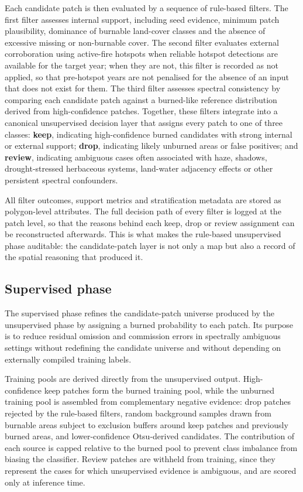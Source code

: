 \documentclass[
  british,
  a4paper,
]{scrbook}
\begin{document}
Each candidate patch is then evaluated by a sequence of rule-based
filters. The first filter assesses internal support, including seed
evidence, minimum patch plausibility, dominance of burnable land-cover
classes and the absence of excessive missing or non-burnable cover. The
second filter evaluates external corroboration using active-fire
hotspots when reliable hotspot detections are available for the target
year; when they are not, this filter is recorded as not applied, so that
pre-hotspot years are not penalised for the absence of an input that
does not exist for them. The third filter assesses spectral consistency
by comparing each candidate patch against a burned-like reference
distribution derived from high-confidence patches. Together, these
filters integrate into a canonical unsupervised decision layer that
assigns every patch to one of three classes: \textbf{keep}, indicating
high-confidence burned candidates with strong internal or external
support; \textbf{drop}, indicating likely unburned areas or false
positives; and \textbf{review}, indicating ambiguous cases often
associated with haze, shadows, drought-stressed herbaceous systems,
land-water adjacency effects or other persistent spectral confounders.

All filter outcomes, support metrics and stratification metadata are
stored as polygon-level attributes. The full decision path of every
filter is logged at the patch level, so that the reasons behind each
keep, drop or review assignment can be reconstructed afterwards. This is
what makes the rule-based unsupervised phase auditable: the
candidate-patch layer is not only a map but also a record of the spatial
reasoning that produced it.

\subsection{Supervised phase}\label{supervised-phase}

The supervised phase refines the candidate-patch universe produced by
the unsupervised phase by assigning a burned probability to each patch.
Its purpose is to reduce residual omission and commission errors in
spectrally ambiguous settings without redefining the candidate universe
and without depending on externally compiled training labels.

Training pools are derived directly from the unsupervised output.
High-confidence keep patches form the burned training pool, while the
unburned training pool is assembled from complementary negative
evidence: drop patches rejected by the rule-based filters, random
background samples drawn from burnable areas subject to exclusion
buffers around keep patches and previously burned areas, and
lower-confidence Otsu-derived candidates. The contribution of each
source is capped relative to the burned pool to prevent class imbalance
from biasing the classifier. Review patches are withheld from training,
since they represent the cases for which unsupervised evidence is
ambiguous, and are scored only at inference time.
\end{document}
